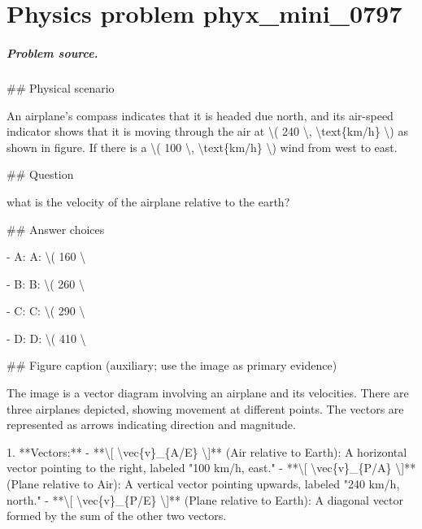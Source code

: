 
\chapter{Physics problem phyx\_mini\_0797}
\label{ch:PhyXMiniProblems_problem_phyx_mini_0797}

\paragraph{Problem source.}
\#\# Physical scenario

An airplane's compass indicates that it is headed due north, and its air-speed indicator shows that it is moving through the air at \textbackslash{}( 240 \textbackslash{}, \textbackslash{}text\{km/h\} \textbackslash{}) as shown in figure. If there is a \textbackslash{}( 100 \textbackslash{}, \textbackslash{}text\{km/h\} \textbackslash{}) wind from west to east.

\#\# Question

what is the velocity of the airplane relative to the earth?

\#\# Answer choices

- A: A: \textbackslash{}( 160 \textbackslash{}

- B: B: \textbackslash{}( 260 \textbackslash{}

- C: C: \textbackslash{}( 290 \textbackslash{}

- D: D: \textbackslash{}( 410 \textbackslash{}

\#\# Figure caption (auxiliary; use the image as primary evidence)

The image is a vector diagram involving an airplane and its velocities. There are three airplanes depicted, showing movement at different points. The vectors are represented as arrows indicating direction and magnitude.

1. **Vectors:**
   - **\textbackslash{}[ \textbackslash{}vec\{v\}\_\{A/E\} \textbackslash{}]** (Air relative to Earth): A horizontal vector pointing to the right, labeled "100 km/h, east."
   - **\textbackslash{}[ \textbackslash{}vec\{v\}\_\{P/A\} \textbackslash{}]** (Plane relative to Air): A vertical vector pointing upwards, labeled "240 km/h, north."
   - **\textbackslash{}[ \textbackslash{}vec\{v\}\_\{P/E\} \textbackslash{}]** (Plane relative to Earth): A diagonal vector formed by the sum of the other two vectors. 

